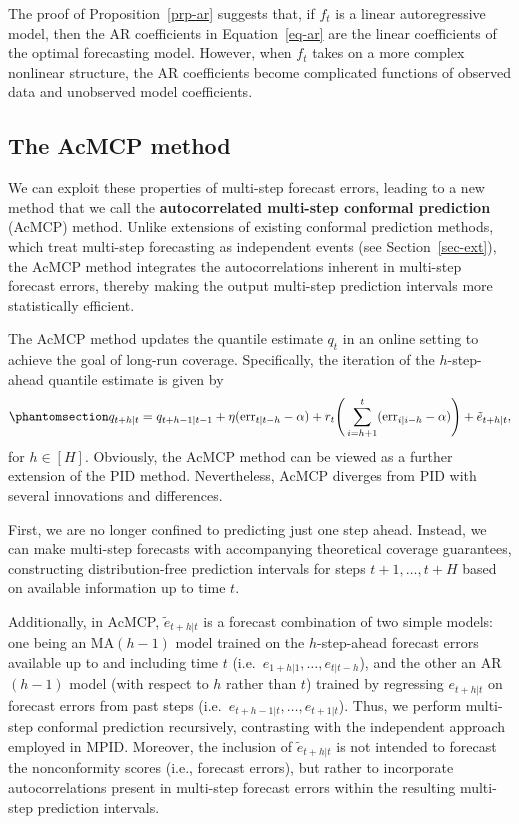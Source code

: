 \documentclass[
  11pt,
  a4paper,
]{article}
\theoremstyle{plain}
\theoremstyle{remark}
\begin{document}
The proof of Proposition~\ref{prp-ar} suggests that, if \(f_t\) is a
linear autoregressive model, then the AR coefficients in
Equation~\ref{eq-ar} are the linear coefficients of the optimal
forecasting model. However, when \(f_t\) takes on a more complex
nonlinear structure, the AR coefficients become complicated functions of
observed data and unobserved model coefficients.

\subsection{The AcMCP method}\label{sec-novel}

We can exploit these properties of multi-step forecast errors, leading
to a new method that we call the \textbf{autocorrelated multi-step
conformal prediction} (AcMCP) method. Unlike extensions of existing
conformal prediction methods, which treat multi-step forecasting as
independent events (see Section~\ref{sec-ext}), the AcMCP method
integrates the autocorrelations inherent in multi-step forecast errors,
thereby making the output multi-step prediction intervals more
statistically efficient.

The AcMCP method updates the quantile estimate \(q_t\) in an online
setting to achieve the goal of long-run coverage. Specifically, the
iteration of the \(h\)-step-ahead quantile estimate is given by
\begin{equation}\phantomsection\label{eq-acmcp}{
q_{t+h|t}=q_{t+h-1|t-1}+\eta (\mathrm{err}_{t|t-h}-\alpha)+r_t\Bigg(\sum_{i=h+1}^t (\mathrm{err}_{i|i-h}-\alpha)\Bigg)+\tilde{e}_{t+h|t},
}\end{equation} for \(h\in[H]\). Obviously, the AcMCP method can be
viewed as a further extension of the PID method. Nevertheless, AcMCP
diverges from PID with several innovations and differences.

First, we are no longer confined to predicting just one step ahead.
Instead, we can make multi-step forecasts with accompanying theoretical
coverage guarantees, constructing distribution-free prediction intervals
for steps \(t+1,\ldots,t+H\) based on available information up to time
\(t\).

Additionally, in AcMCP, \(\tilde{e}_{t+h|t}\) is a forecast combination
of two simple models: one being an MA\((h-1)\) model trained on the
\(h\)-step-ahead forecast errors available up to and including time
\(t\) (i.e.~\(e_{1+h|1}, \ldots, e_{t|t-h}\)), and the other an
AR\((h-1)\) model (with respect to \(h\) rather than \(t\)) trained by
regressing \(e_{t+h|t}\) on forecast errors from past steps
(i.e.~\(e_{t+h-1|t}, \ldots, e_{t+1|t}\)). Thus, we perform multi-step
conformal prediction recursively, contrasting with the independent
approach employed in MPID. Moreover, the inclusion of
\(\tilde{e}_{t+h|t}\) is not intended to forecast the nonconformity
scores (i.e., forecast errors), but rather to incorporate
autocorrelations present in multi-step forecast errors within the
resulting multi-step prediction intervals.
\end{document}
